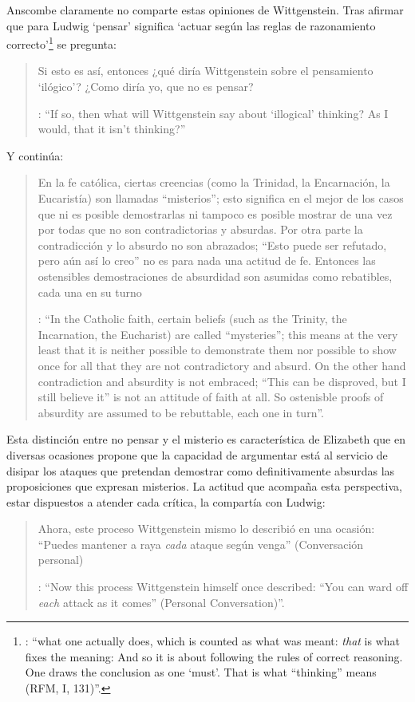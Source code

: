 Anscombe claramente no comparte estas opiniones de Wittgenstein. Tras afirmar que para Ludwig `pensar' significa \enquote*{actuar según las reglas de razonamiento correcto}\footnote{\Cite[131]{anscombe1981parmenides:qli}: \enquote{what one actually does, which is counted as what was meant: \emph{that} is what fixes the meaning: And so it is about following the rules of correct reasoning. One draws the conclusion as one `must'. That is what ``thinking'' means (RFM, I, 131)}.} se pregunta: \blockquote[{\Cite[122]{anscombe1981parmenides:qli}}: \enquote{If so, then what will Wittgenstein say about `illogical' thinking? As I would, that it isn't thinking?}]{Si esto es así, entonces ¿qué diría Wittgenstein sobre el pensamiento `ilógico'? ¿Como diría yo, que no es pensar?} Y continúa: \blockquote[{\Cite[122]{anscombe1981parmenides:qli}}: \enquote{In the Catholic faith, certain beliefs (such as the Trinity, the Incarnation, the Eucharist) are called ``mysteries''; this means at the very least that it is neither possible to demonstrate them nor possible to show once for all that they are not contradictory and absurd. On the other hand contradiction and absurdity is not embraced; ``This can be disproved, but I still believe it'' is not an attitude of faith at all. So ostenisble proofs of absurdity are assumed to be rebuttable, each one in turn}.]{En la fe católica, ciertas creencias (como la Trinidad, la Encarnación, la Eucaristía) son llamadas ``misterios''; esto significa en el mejor de los casos que ni es posible demostrarlas ni tampoco es posible mostrar de una vez por todas que no son contradictorias y absurdas. Por otra parte la contradicción y lo absurdo no son abrazados; ``Esto puede ser refutado, pero aún así lo creo'' no es para nada una actitud de fe. Entonces las ostensibles demostraciones de absurdidad son asumidas como rebatibles, cada una en su turno}. Esta distinción entre no pensar y el misterio es característica de Elizabeth que en diversas ocasiones propone que la capacidad de argumentar está al servicio de disipar los ataques que pretendan demostrar como definitivamente absurdas las proposiciones que expresan misterios. La actitud que acompaña esta perspectiva, estar dispuestos a atender cada crítica, la compartía con Ludwig: \blockquote[{\Cite[122]{anscombe1981parmenides:qli}}: \enquote{Now this process Wittgenstein himself once described: ``You can ward off \emph{each} attack as it comes'' (Personal Conversation)}.]{Ahora, este proceso Wittgenstein mismo lo describió en una ocasión: ``Puedes mantener a raya \emph{cada} ataque según venga'' (Conversación personal)}.

